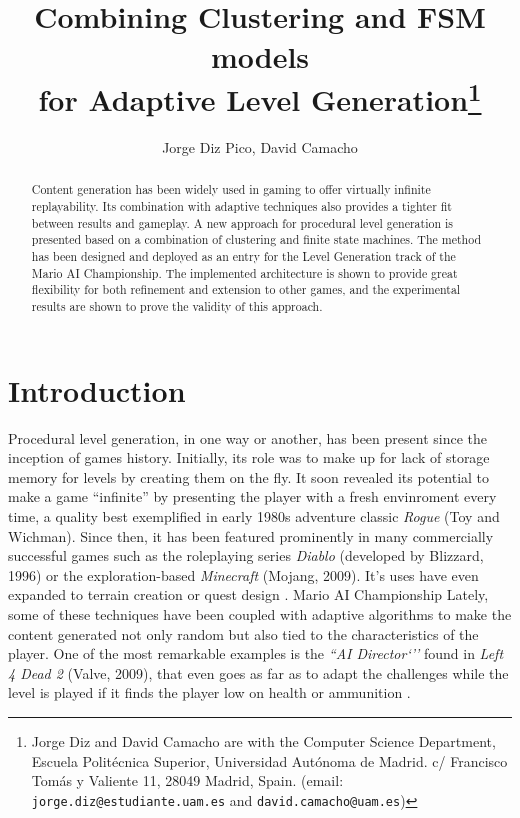 \documentclass[conference]{IEEEtran}
\begin{document}
\title{\ \\ \LARGE\bf Combining Clustering and FSM models \\ for Adaptive Level Generation\thanks{Jorge Diz and David Camacho are with the Computer Science Department, Escuela Politécnica Superior, Universidad Autónoma de Madrid. c/ Francisco Tomás y Valiente 11, 28049 Madrid, Spain. (email: {\tt jorge.diz@estudiante.uam.es} and {\tt david.camacho@uam.es})}}

\author{Jorge Diz Pico, David Camacho}


\maketitle

\begin{abstract}
Content generation has been widely used in gaming
to offer virtually infinite replayability.
Its combination with adaptive techniques also provides a tighter fit between
results and gameplay.
A new approach for procedural level generation
is presented based on a combination of clustering and finite state machines.
The method has been designed and deployed as an entry for the 
Level Generation track of the Mario AI Championship.
The implemented architecture is shown to provide
great flexibility for both refinement and
extension to other games, and the
experimental results are shown to prove
the validity of this approach. 

\end{abstract}


\section{Introduction}
Procedural level generation, in one way or another, has been present since the inception of games history. Initially, its role was to make up for lack of storage memory for levels by creating them on the fly. It soon revealed its potential to make a game ``infinite'' by presenting the player with a fresh envinroment every time, a quality best exemplified in early 1980s adventure classic \textit{Rogue} (Toy and Wichman). Since then, it has been featured prominently in many commercially successful games such as the roleplaying series \textit{Diablo} (developed by Blizzard, 1996) or the exploration-based \textit{Minecraft} (Mojang, 2009). It's uses have even expanded to terrain creation \cite{rodenparberry2004} or quest design \cite{mmorpg06}.
Mario AI Championship
Lately, some of these techniques have been coupled with adaptive algorithms to make the content generated not only random but also tied to the characteristics of the player. One of the most remarkable examples is the \textit{``AI Director`''} found in \textit{Left 4 Dead 2} (Valve, 2009), that even goes as far as to adapt the challenges while the level is played if it finds the player low on health or ammunition \cite{l4d09}.
\end{document}
